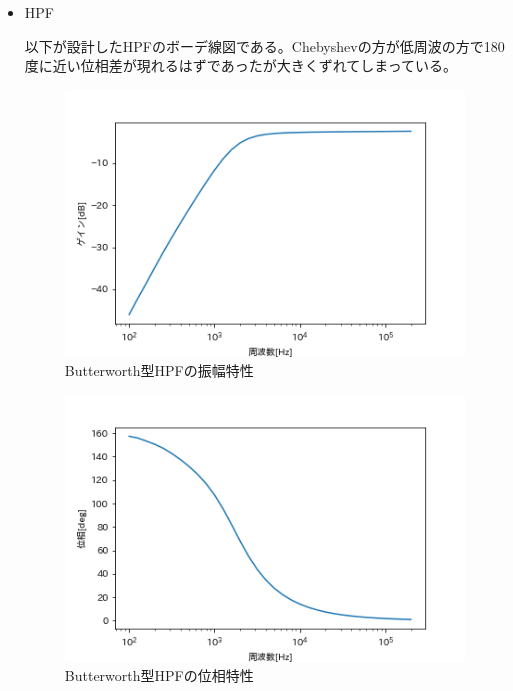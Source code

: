 \documentclass[dvipdfmx, twocolumn]{jsarticle}
\begin{document}
\begin{enumerate}
\begin{itemize}
\item HPF

以下が設計したHPFのボーデ線図である。Chebyshevの方が低周波の方で180度に近い位相差が現れるはずであったが大きくずれてしまっている。

\begin{figure}[H]
\begin{center}
\includegraphics[scale = 0.5]{BGHPF.png}
\caption{Butterworth型HPFの振幅特性}
\end{center}
\end{figure}

\begin{figure}[H]
\begin{center}
\includegraphics[scale = 0.5]{BPHPF.png}
\caption{Butterworth型HPFの位相特性}
\end{center}
\end{figure}


\end{itemize}
\end{enumerate}
\end{document}
